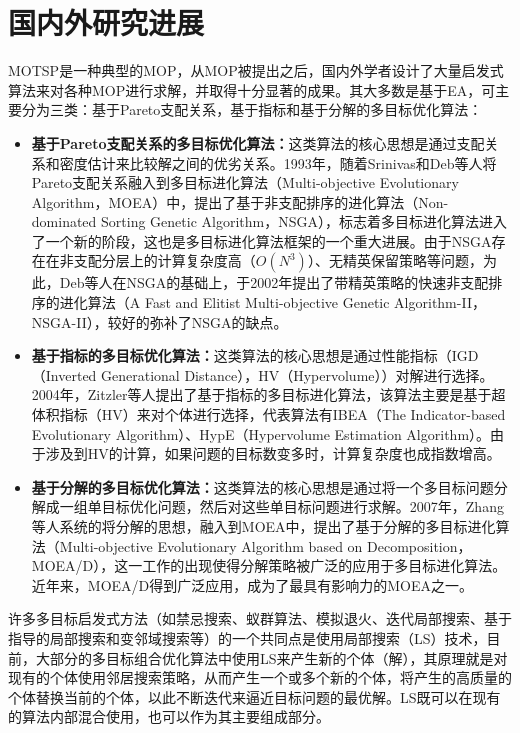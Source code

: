 \section{国内外研究进展}
MOTSP是一种典型的MOP，从MOP被提出之后，国内外学者设计了大量启发式算法来对各种MOP进行求解，并取得十分显著的成果。其大多数是基于EA，可主要分为三类：基于Pareto支配关系，基于指标和基于分解的多目标优化算法：
\begin{itemize}
    \item \textbf{基于Pareto支配关系的多目标优化算法：}这类算法的核心思想是通过支配关系和密度估计来比较解之间的优劣关系。1993年，随着Srinivas和Deb等人将Pareto支配关系融入到多目标进化算法（Multi-objective Evolutionary Algorithm，MOEA）中，提出了基于非支配排序的进化算法（Non-dominated Sorting Genetic Algorithm，NSGA）\cite{srinivas1994muiltiobjective}，标志着多目标进化算法进入了一个新的阶段，这也是多目标进化算法框架的一个重大进展。由于NSGA存在在非支配分层上的计算复杂度高（$O(N^3)$）、无精英保留策略等问题，为此，Deb等人在NSGA的基础上，于2002年提出了带精英策略的快速非支配排序的进化算法（A Fast and Elitist Multi-objective Genetic Algorithm-II，NSGA-II）\cite{deb2002fast}，较好的弥补了NSGA的缺点。
    \item \textbf{基于指标的多目标优化算法：}这类算法的核心思想是通过性能指标（IGD（Inverted Generational Distance）\cite{bosman2003balance}，HV（Hypervolume）\cite{zitzler1999multiobjective}）对解进行选择。2004年，Zitzler等人提出了基于指标的多目标进化算法，该算法主要是基于超体积指标（HV）来对个体进行选择，代表算法有IBEA（The Indicator-based Evolutionary Algorithm）\cite{zitzler2004indicator}、HypE（Hypervolume Estimation Algorithm）\cite{bader2011hype}。由于涉及到HV的计算，如果问题的目标数变多时，计算复杂度也成指数增高。
    \item \textbf{基于分解的多目标优化算法：}这类算法的核心思想是通过将一个多目标问题分解成一组单目标优化问题，然后对这些单目标问题进行求解。2007年，Zhang等人系统的将分解的思想，融入到MOEA中，提出了基于分解的多目标进化算法（Multi-objective Evolutionary Algorithm based on Decomposition，MOEA/D）\cite{zhang2007moea}，这一工作的出现使得分解策略被广泛的应用于多目标进化算法。近年来，MOEA/D得到广泛应用，成为了最具有影响力的MOEA之一。
\end{itemize}
\par
许多多目标启发式方法（如禁忌搜索\cite{ulungu1999mosa}、蚁群算法\cite{garcia2004empirical}、模拟退火\cite{bandyopadhyay2008simulated}、迭代局部搜索\cite{paquete2009design}、基于指导的局部搜索\cite{alsheddy2010guided}和变邻域搜索\cite{liang2010multi}等）的一个共同点是使用局部搜索（LS）技术，目前，大部分的多目标组合优化算法中使用LS来产生新的个体（解），其原理就是对现有的个体使用邻居搜索策略，从而产生一个或多个新的个体，将产生的高质量的个体替换当前的个体，以此不断迭代来逼近目标问题的最优解。LS既可以在现有的算法内部混合使用，也可以作为其主要组成部分。
